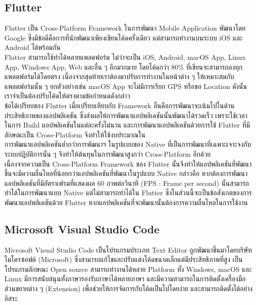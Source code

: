 \subsection{Flutter}
Flutter เป็น Cross-Platform Framework ในการพัฒนา Mobile Application พัฒนาโดย Google ซึ่งมีข้อดีคือการที่นักพัฒนาเพียงเขียนโค้ดครั้งเดียว แต่สามารถทำงานบนระบบ iOS และ Android ได้พร้อมกัน
\\\indent
Flutter สามารถใช้ทำได้หลายแพลตฟอร์ม ไม่ว่าจะเป็น iOS, Android, macOS App, Linux App, Windows App, Web และอื่น ๆ อีกมากมาย โดยโค้ดกว่า 80\% ที่เขียนจะสามารถลงทุกแพลตฟอร์มได้โดยตรง เนื่องจากสุดท้ายเราต้องมาปรับการทำงานในหน้าต่าง ๆ ให้เหมาะสมกับแพลตฟอร์มนั้น ๆ ยกตัวอย่างเช่น macOS App จะไม่มีการเรียก GPS หรือขอ Location ดังนั้นเราจำเป็นต้องปรับโค้ดให้ตรงตามข้อกำหนดดังกล่าว
\\\indent
ข้อได้เปรียบของ Flutter เมื่อเปรียบเทียบกับ Framework อื่นคือการพัฒนาจะเน้นไปในด้านประสิทธิภาพของแอปพลิเคชัน ซึ่งส่งผลให้การพัฒนาแอปพลิเคชันนั้นพัฒนาได้รวดเร็ว เพราะใช้เวลาในการ Build แอปพลิเคชันในแต่ละครั้งไม่นาน และการพัฒนาแอปพลิเคชันด้วยการใช้ Flutter ที่มีลักษณะเป็น Cross-Platform จึงทำให้ใช้งบประมาณใน\\การพัฒนาแอปพลิเคชันต่ำกว่าการพัฒนาฯ ในรูปแบบของ Native ที่เป็นการพัฒนาที่เฉพาะเจาะจงกับระบบปฏิบัติการนั้น ๆ จึงทำให้ต้นทุนในการพัฒนาสูงกว่า Cross-Platform อีกด้วย
\\\indent
เนื่องจากความเป็น Cross-Platform Framework ของ Flutter นั้นจึงทำให้แอปพลิเคชันที่พัฒนาขึ้นจะมีความลื่นไหลที่น้อยกว่าแอปพลิเคชันที่พัฒนาในรูปแบบ Native กล่าวคือ หากต้องการพัฒนาแอปพลิเคชันที่มีอัตราเฟรมที่แสดงผล 60 ภาพต่อวินาที (FPS : Frame per second) นั้นสามารถทำได้ในการพัฒนาแบบ Native แต่ไม่สามารถทำได้ใน Flutter ซึ่งในส่วนนี้จะเป็นข้อสังเกตของการพัฒนาแอปพลิเคชันด้วย Flutter หากแอปพลิเคชันที่จะพัฒนานั้นต้องการความลื่นไหลในการใช้งาน

\subsection{Microsoft Visual Studio Code}
Microsoft Visual Studio Code เป็นโปรแกรมประเภท Text Editor ถูกพัฒนาขึ้นมาโดยบริษัทไมโครซอฟต์ (Microsoft) ซึ่งสามารถแก้ไขและปรับแต่งโค้ดขนาดเล็กแต่มีประสิทธิภาพที่สูง เป็นโปรแกรมลักษณะ Open source สามารถทำงานได้หลาย Platform ทั้ง Windows, macOS และ Linux มีการสนับสนุนทั้งภาษารองรับภาษาได้หลายภาษา และมีความสามารถในการติดตั้งเครื่องมือส่วนขยายต่าง ๆ (Extension) เพื่อช่วยให้การจัดการกับโค้ดเป็นไปโดยง่าย และสามารถติดตั้งได้อย่างอิสระ
